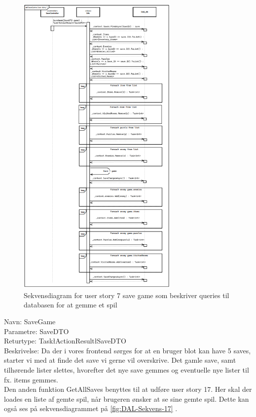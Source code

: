 \begin{figure}[H]
\centering
\includegraphics[width = 0.7\textwidth]{02-Body/Images/DAL-Database/SaveSd.PNG}
\caption{Sekvensdiagram for user story 7 save game som beskriver queries til databasen for at gemme et spil}
\label{fig:DAL-Sekvens-7}
\end{figure}


Navn: SaveGame\\
Parametre: SaveDTO\\
Returtype: Task\l ActionResult\l SaveDTO\g\g \\
Beskrivelse: Da der i vores frontend sørges for at en bruger blot kan have 5 saves, starter vi med at finde det save vi gerne vil overskrive. Det gamle save, samt tilhørende lister slettes, hvorefter det nye save gemmes og eventuelle nye lister til fx. items gemmes.\\

Den anden funktion GetAllSaves benyttes til at udføre user story 17.
Her skal der loades en liste af gemte spil, når brugeren ønsker at se sine gemte spil. Dette kan også ses på sekvensdiagrammet på \autoref{fig:DAL-Sekvens-17} .

